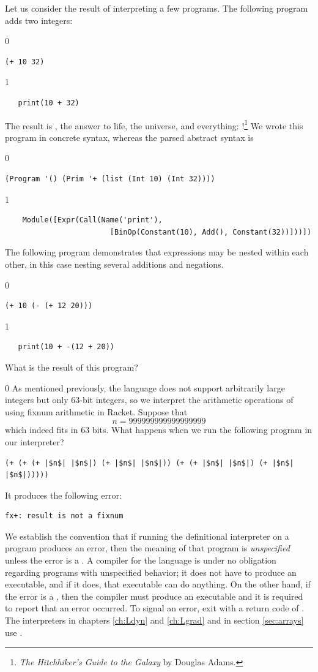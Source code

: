 \documentclass[7x10]{TimesAPriori_MIT}%
\def\racketEd{0}
\def\pythonEd{1}
\providecommand{\BookEdition}{1}
\let\edition\BookEdition
\newcommand{\pythonColor}[0]{}
\numberwithin{theorem}{chapter}
\numberwithin{definition}{chapter}
\numberwithin{equation}{chapter}
\begin{document}
Let us consider the result of interpreting a few \LangInt{} programs. The
following program adds two integers:
{\if\edition\racketEd
\begin{lstlisting}
(+ 10 32)
\end{lstlisting}
\fi}
{\if\edition\pythonEd\pythonColor
\begin{lstlisting}
   print(10 + 32)
\end{lstlisting}
\fi}
%
\noindent The result is , the answer to life, the universe,
and everything: !\footnote{\emph{The Hitchhiker's Guide to
    the Galaxy} by Douglas Adams.}
%
We wrote this program in concrete syntax, whereas the parsed
abstract syntax is
{\if\edition\racketEd
\begin{lstlisting}
(Program '() (Prim '+ (list (Int 10) (Int 32))))
\end{lstlisting}
\fi}
{\if\edition\pythonEd\pythonColor
\begin{lstlisting}
    Module([Expr(Call(Name('print'),
                        [BinOp(Constant(10), Add(), Constant(32))]))])        
\end{lstlisting}
\fi}
The following program demonstrates that expressions may be nested within
each other, in this case nesting several additions and negations.
{\if\edition\racketEd
\begin{lstlisting}
(+ 10 (- (+ 12 20)))
\end{lstlisting}
\fi}
{\if\edition\pythonEd\pythonColor
\begin{lstlisting}
   print(10 + -(12 + 20))
\end{lstlisting}
\fi}
%
\noindent What is the result of this program?

{\if\edition\racketEd
As mentioned previously, the \LangInt{} language does not support
arbitrarily large integers but only $63$-bit integers, so we
interpret the arithmetic operations of \LangInt{} using fixnum arithmetic
in Racket.
Suppose that
\[
  n = 999999999999999999
\]
which indeed fits in $63$ bits.  What happens when we run the
following program in our interpreter?
\begin{lstlisting}
(+ (+ (+ |$n$| |$n$|) (+ |$n$| |$n$|)) (+ (+ |$n$| |$n$|) (+ |$n$| |$n$|)))))
\end{lstlisting}
It produces the following error:
\begin{lstlisting}
fx+: result is not a fixnum
\end{lstlisting}
We establish the convention that if running the definitional
interpreter on a program produces an error, then the meaning of that
program is \emph{unspecified} unless the
error is a . A compiler for the language is under
no obligation regarding programs with unspecified behavior; it does
not have to produce an executable, and if it does, that executable can
do anything.  On the other hand, if the error is a
, then the compiler must produce an executable and
it is required to report that an error occurred. To signal an error,
exit with a return code of .  The interpreters in chapters
\ref{ch:Ldyn} and \ref{ch:Lgrad} and in section \ref{sec:arrays} use
.
\fi}
\end{document}
